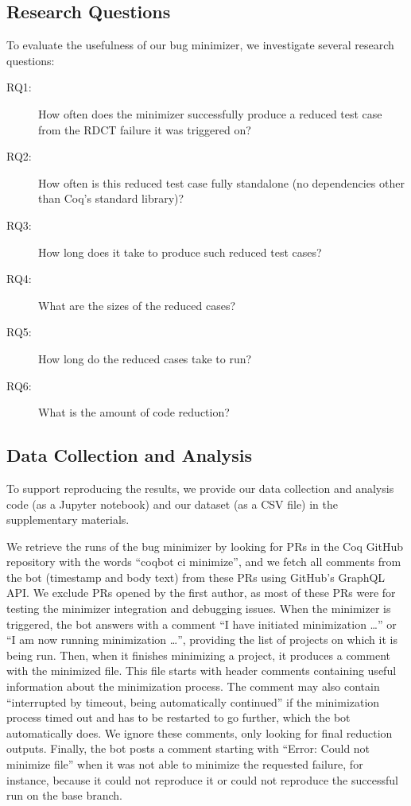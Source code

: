 \documentclass[a4paper,USenglish,cleveref,autoref,thm-restate,pdfa]{lipics-v2021}
\begin{document}
\subsection{Research Questions}

To evaluate the usefulness of our bug minimizer, we investigate several research questions:
\begin{description}
\item[RQ1:] How often does the minimizer successfully produce a reduced test case from the RDCT failure it was triggered on?
\item[RQ2:] How often is this reduced test case fully standalone (no dependencies other than Coq's standard library)?
\item[RQ3:] How long does it take to produce such reduced test cases?
\item[RQ4:] What are the sizes of the reduced cases?
\item[RQ5:] How long do the reduced cases take to run?
\item[RQ6:] What is the amount of code reduction?
\end{description}

\subsection{Data Collection and Analysis}

To support reproducing the results, we provide our data collection and analysis code (as a Jupyter notebook) and our dataset (as a CSV file) in the supplementary materials.

We retrieve the runs of the bug minimizer by looking for PRs in the Coq GitHub repository with the words ``coqbot ci minimize'', and we fetch all comments from the bot (timestamp and body text) from these PRs using GitHub's GraphQL API.
We exclude PRs opened by the first author, as most of these PRs were for testing the minimizer integration and debugging issues.
When the minimizer is triggered, the bot answers with a comment ``I have initiated minimization \ldots'' or ``I am now running minimization \ldots'', providing the list of projects on which it is being run.
%
Then, when it finishes minimizing a project, it produces a comment with the minimized file.
%
This file starts with header comments containing useful information about the minimization process.
%
The comment may also contain ``interrupted by timeout, being automatically continued'' if the minimization process timed out and has to be restarted to go further, which the bot automatically does.
%
We ignore these comments, only looking for final reduction outputs.
%
Finally, the bot posts a comment starting with ``Error: Could not minimize file'' when it was not able to minimize the requested failure, for instance, because it could not reproduce it or could not reproduce the successful run on the base branch.
\end{document}
